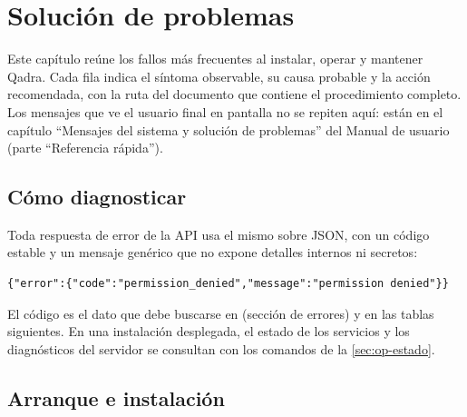 \chapter{Solución de problemas}\label{cap:problemas}

Este capítulo reúne los fallos más frecuentes al instalar, operar y mantener
Qadra. Cada fila indica el síntoma observable, su causa probable y la acción
recomendada, con la ruta del documento que contiene el procedimiento completo.
Los mensajes que ve el usuario final en pantalla no se repiten aquí: están en
el capítulo \enquote{Mensajes del sistema y solución de problemas} del Manual
de usuario (parte \enquote{Referencia rápida}).

\section{Cómo diagnosticar}\label{sec:prob-diagnostico}

Toda respuesta de error de la API usa el mismo sobre JSON, con un código
estable y un mensaje genérico que no expone detalles internos ni secretos:

\begin{verbatim}
{"error":{"code":"permission_denied","message":"permission denied"}}
\end{verbatim}

El código es el dato que debe buscarse en  (sección
de errores) y en las tablas siguientes. En una instalación desplegada, el
estado de los servicios y los diagnósticos del servidor se consultan con los
comandos de la \cref{sec:op-estado}.


\section{Arranque e instalación}\label{sec:prob-arranque}


